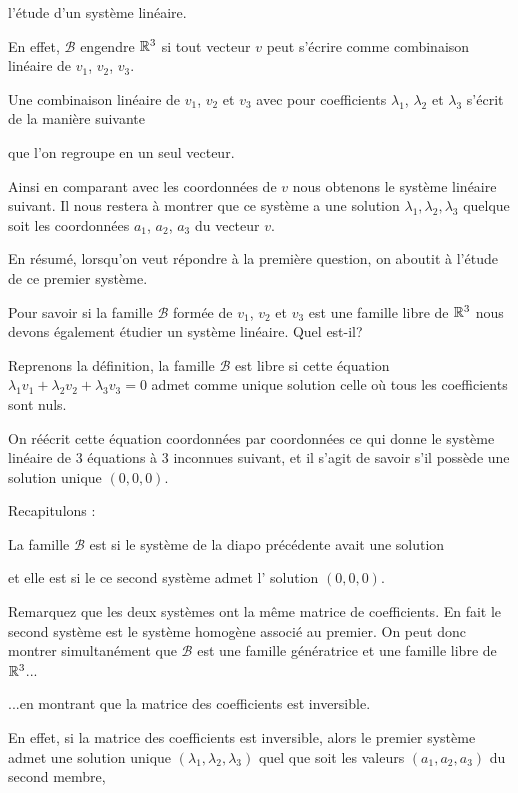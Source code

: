 l'étude d'un système linéaire. 


\change
En effet, $\mathcal{B}$ engendre $\mathbb{R}^3$ si tout vecteur $v$ %
peut s'écrire comme combinaison linéaire de $v_1$, $v_2$, $v_3$.

\change
Une combinaison linéaire de $v_1$, $v_2$ et $v_3$ avec pour 
coefficients $\lambda_1$, $\lambda_2$ et $\lambda_3$ s'écrit de la manière suivante

\change
que l'on regroupe en un seul vecteur.


\change
Ainsi en comparant avec les coordonnées de $v$ nous obtenons le système linéaire suivant.
Il nous restera à montrer que ce système a une solution $\lambda_1, \lambda_2, \lambda_3$
quelque soit les coordonnées $a_1$, $a_2$, $a_3$ du vecteur $v$.

En résumé, lorsqu'on veut répondre à la première question, 
on aboutit à l'étude de ce premier système.


\diapo

Pour savoir si la famille $\mathcal{B}$ formée 
de $v_1$, $v_2$ et $v_3$ est une famille libre de $\mathbb{R}^3$ nous 
devons également étudier un système linéaire. Quel est-il? 

\change
Reprenons la définition, la famille $\mathcal{B}$ est libre 
si cette équation $ \lambda_1 v_1+ \lambda_2 v_2 + \lambda_3 v_3= 0$ 
admet comme unique solution celle o\`u tous les coefficients sont nuls.


\change
On réécrit cette équation coordonnées par coordonnées ce qui donne le système linéaire  de 3 équations à 3 inconnues suivant, 
et il s'agit de savoir s'il possède une solution unique $(0,0,0)$.

Recapitulons :

La famille $\mathcal{B}$ est  
si le système de la diapo précédente avait une solution

et elle est 
si le ce second système admet l' solution $(0,0,0)$.

\change
Remarquez que les deux systèmes ont la même matrice de coefficients. 
En fait le second système est le système homogène associé au premier.
  On peut donc montrer simultanément que $\mathcal{B}$ est une famille génératrice 
  et une famille libre de $\mathbb{R}^3$...
  
\change
...en montrant que la matrice des coefficients est inversible.

\change
En effet, si la matrice des coefficients est inversible, alors le premier système
admet une solution unique $(\lambda_1,\lambda_2,\lambda_3)$ 
quel que soit les valeurs $(a_1,a_2,a_3)$ du second membre, 

